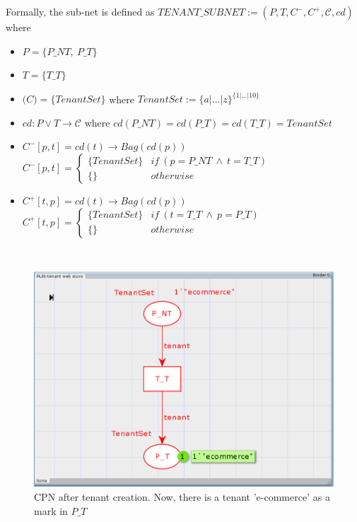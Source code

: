 \documentclass[12pt,english]{article} %
\begin{document}
Formally, the sub-net is defined as $TENANT\_SUBNET :=                (P, T, C^-, C^+, \mathcal{C}, cd)$ where
\begin{itemize}
    \item $P = \{P\_NT,\ P\_T\}$
    \item $T = \{T\_T\}$
    \item $\mathcal(C) = \{TenantSet\}$ where $TenantSet := \{a | ...|z \}^{\{1|...|10\}}$
    \item $cd : P\vee T \rightarrow \mathcal{C}$
    where $cd (P\_NT) = cd(P\_T) = cd(T\_T) = TenantSet$
    \item $C^-[p,t] = cd(t) \rightarrow Bag(cd(p))$\newline
    $C^-[p,t] = \begin{cases} 
      \{TenantSet\} & if\  (p=P\_NT\  \wedge\  t=T\_T)\\
      \{\}          & otherwise
   \end{cases}$
    \item $C^+[t,p] = cd(t) \rightarrow Bag(cd(p))$\newline
    $C^+[t,p] = \begin{cases} 
      \{TenantSet\} & if\  (t=T\_T\  \wedge\  p=P\_T) \\
      \{\}          & otherwise
   \end{cases}$
\end{itemize}

\

\begin{figure}[H]
    \centering
    \includegraphics[scale=0.45]{img/mws/cpn/mws_cpn_tenant_created.png}
    \caption{CPN after tenant creation. Now, there is a tenant 'e-commerce' as a mark in $P\_T$}
    \label{fig:mws-cpn-tenant-created}
\end{figure}
\end{document}
